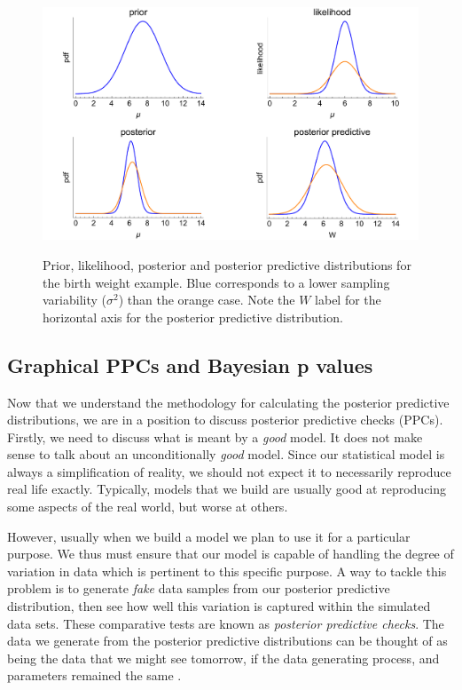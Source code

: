 \documentclass[11pt,fullpage]{book}
\begin{document}
\begin{figure}
\centering
\scalebox{0.5} 
{\includegraphics{Evaluation_normalPosteriorPredictiveWeight.pdf}}
\caption{Prior, likelihood, posterior and posterior predictive distributions for the birth weight example. Blue corresponds to a lower sampling variability ($\sigma^2$) than the orange case. Note the $W$ label for the horizontal axis for the posterior predictive distribution.}\label{fig:Evaluation_normalPosteriorPredictiveWeight}
\end{figure}

\subsection{Graphical PPCs and Bayesian p values}
Now that we understand the methodology for calculating the posterior predictive distributions, we are in a position to discuss posterior predictive checks (PPCs). Firstly, we need to discuss what is meant by a \textit{good} model. It does not make sense to talk about an unconditionally \textit{good} model. Since our statistical model is always a simplification of reality, we should not expect it to necessarily reproduce real life exactly. Typically, models that we build are usually good at reproducing some aspects of the real world, but worse at others.

However, usually when we build a model we plan to use it for a particular purpose. We thus must ensure that our model is capable of handling the degree of variation in data which is pertinent to this specific purpose. A way to tackle this problem is to generate \textit{fake} data samples from our posterior predictive distribution, then see how well this variation is captured within the simulated data sets. These comparative tests are known as \textit{posterior predictive checks}. The data we generate from the posterior predictive distributions can be thought of as being the data that we might see tomorrow, if the data generating process, and parameters remained the same \cite{gelman2013bayesian}.
\end{document}

